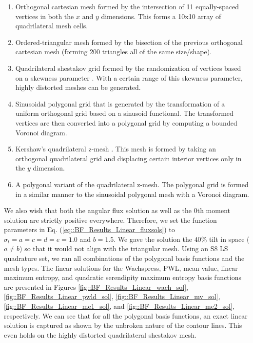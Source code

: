 \begin{enumerate}
	\item Orthogonal cartesian mesh formed by the intersection of 11 equally-spaced vertices in both the $x$ and $y$ dimensions. This forms a 10x10 array of quadrilateral mesh cells.
	\item Ordered-triangular mesh formed by the bisection of the previous orthogonal cartesian mesh (forming 200 triangles all of the same size/shape).
	\item Quadrilateral shestakov grid formed by the randomization of vertices based on a skewness parameter \cite{shestakov1988solution,shestakov1990test}. With a certain range of this skewness parameter, highly distorted meshes can be generated.
	\item Sinusoidal polygonal grid that is generated by the transformation of a uniform orthogonal grid based on a sinusoid functional. The transformed vertices are then converted into a polygonal grid by computing a bounded Voronoi diagram.
	\item Kershaw's quadrilateral z-mesh \cite{kershaw1981differencing}. This mesh is formed by taking an orthogonal quadrilateral grid and displacing certain interior vertices only in the $y$ dimension.
	\item A polygonal variant of the quadrilateral z-mesh. The polygonal grid is formed in a similar manner to the sinusoidal polygonal mesh with a Voronoi diagram.
\end{enumerate}

\noindent We also wish that both the angular flux solution as well as the 0th moment solution are strictly positive everywhere. Therefore, we set the function parameters in Eq. (\ref{eq::BF_Results_Linear_fluxsols}) to $\sigma_t = a = c = d = e = 1.0$ and $b = 1.5$. We gave the solution the $40 \%$ tilt in space ($a \neq b$) so that it would not align with the triangular mesh. Using an S8 LS quadrature set, we ran all combinations of the polygonal basis functions and the mesh types. The linear solutions for the Wachspress, PWL, mean value, linear maximum entropy, and quadratic serendipity maximum entropy basis functions are presented in Figures \ref{fig::BF_Results_Linear_wach_sol}, \ref{fig::BF_Results_Linear_pwld_sol}, \ref{fig::BF_Results_Linear_mv_sol}, \ref{fig::BF_Results_Linear_me1_sol}, and \ref{fig::BF_Results_Linear_me2_sol}, respectively. We can see that for all the polygonal basis functions, an exact linear solution is captured as shown by the unbroken nature of the contour lines. This even holds on the highly distorted quadrilateral shestakov mesh.

